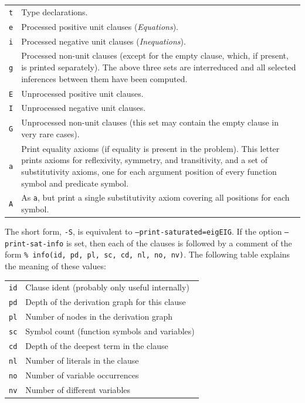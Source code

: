 \documentclass{report}
\begin{document}
\begin{tabular}{lp{9cm}}
  \texttt{t} & Type declarations.\\
  \texttt{e} & Processed positive unit clauses (\emph{Equations}).\\
  \texttt{i} & Processed negative unit clauses (\emph{Inequations}).\\
  \texttt{g} & Processed non-unit clauses (except for the empty
  clause, which, if present, is printed separately). The above three
  sets are interreduced and all selected inferences between them have
  been computed.\\
  \texttt{E} & Unprocessed positive unit clauses.\\
  \texttt{I} & Unprocessed negative unit clauses.\\
  \texttt{G} & Unprocessed non-unit clauses (this set may contain the
  empty clause in very rare cases).\\
  \texttt{a} & Print equality axioms\index{equality axioms} (if equality is present in the
  problem). This letter prints axioms for reflexivity, symmetry, and
  transitivity, and a set of substitutivity axioms, one for each
  argument position of every function symbol and predicate symbol.\\
  \texttt{A} & As \texttt{a}, but print a single substitutivity axiom
  covering all positions for each symbol.\\
\end{tabular}

The short form, \texttt{-S}, is equivalent to
\texttt{--print-saturated=eigEIG}. If the option
\texttt{--print-sat-info} is set, then each of the clauses is followed
by a comment of the form \texttt{\% info(id, pd, pl, sc, cd, nl,
  no, nv)}. The following table explains the meaning of these values:

\begin{tabular}{lp{10cm}}
\texttt{id} & Clause ident (probably only useful internally) \\
\texttt{pd} & Depth of the derivation graph for this clause \\
\texttt{pl} & Number of nodes in the derivation graph \\
\texttt{sc} & Symbol count (function symbols and variables) \\
\texttt{cd} & Depth of the deepest term in the clause \\
\texttt{nl} & Number of literals in the clause \\
\texttt{no} & Number of variable occurrences \\
\texttt{nv} & Number of different variables \\
\end{tabular}
\end{document}
